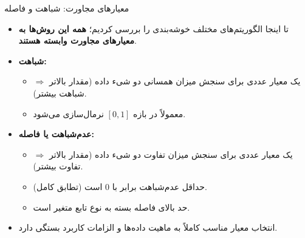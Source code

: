 \begin{frame}{معیارهای مجاورت: شباهت و فاصله}{}
  \begin{itemize}
    \setlength{\itemsep}{6pt}
    \item تا اینجا الگوریتم‌های مختلف خوشه‌بندی را بررسی کردیم؛ \textbf{همه این روش‌ها به معیارهای مجاورت وابسته هستند}.
    \item \textbf{شباهت:} 
    \begin{itemize}
      \setlength{\itemsep}{3pt}
      \item یک معیار عددی برای سنجش میزان همسانی دو شیء داده (مقدار بالاتر $\Rightarrow$ شباهت بیشتر).
      \item معمولاً در بازه $[0, 1]$ نرمال‌سازی می‌شود.
    \end{itemize}
    \item \textbf{عدم‌شباهت یا فاصله:} 
    \begin{itemize}
      \setlength{\itemsep}{3pt}
      \item یک معیار عددی برای سنجش میزان تفاوت دو شیء داده (مقدار بالاتر $\Rightarrow$ تفاوت بیشتر).
      \item حداقل عدم‌شباهت برابر با $0$ است (تطابق کامل).
      \item حد بالای فاصله بسته به نوع تابع متغیر است.
    \end{itemize}
    \item انتخاب معیار مناسب کاملاً به ماهیت داده‌ها و الزامات کاربرد بستگی دارد.
  \end{itemize}
\end{frame}

